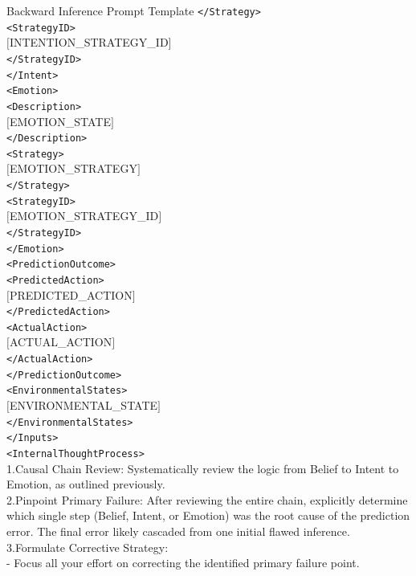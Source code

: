 \documentclass[letterpaper]{article} %
\begin{document}
\begin{promptbox}{Backward Inference Prompt Template}
      \verb|</Strategy>| \\
      \verb|<StrategyID>| \\
      $[$INTENTION\_STRATEGY\_ID$]$ \\
      \verb|</StrategyID>| \\
    \verb|</Intent>| \\
    \verb|<Emotion>| \\
      \verb|<Description>| \\
      $[$EMOTION\_STATE$]$ \\
      \verb|</Description>| \\
      \verb|<Strategy>| \\
      $[$EMOTION\_STRATEGY$]$ \\
      \verb|</Strategy>| \\
      \verb|<StrategyID>| \\
      $[$EMOTION\_STRATEGY\_ID$]$ \\
      \verb|</StrategyID>| \\
    \verb|</Emotion>| \\
    \verb|<PredictionOutcome>| \\
      \verb|<PredictedAction>| \\
      $[$PREDICTED\_ACTION$]$ \\
      \verb|</PredictedAction>| \\
      \verb|<ActualAction>| \\
      $[$ACTUAL\_ACTION$]$ \\
      \verb|</ActualAction>| \\
    \verb|</PredictionOutcome>| \\
    \verb|<EnvironmentalStates>| \\
    $[$ENVIRONMENTAL\_STATE$]$ \\
    \verb|</EnvironmentalStates>| \\
  \verb|</Inputs>| \\
  \verb|<InternalThoughtProcess>| \\
    1.Causal Chain Review: Systematically review the logic from Belief to Intent to Emotion, as outlined previously.\\
    2.Pinpoint Primary Failure: After reviewing the entire chain, explicitly determine which single step (Belief, Intent, or Emotion) was the root cause of the prediction error. The final error likely cascaded from one initial flawed inference. \\
    3.Formulate Corrective Strategy: \\
     - Focus all your effort on correcting the identified primary failure point. \\

\end{promptbox}
\end{document}
